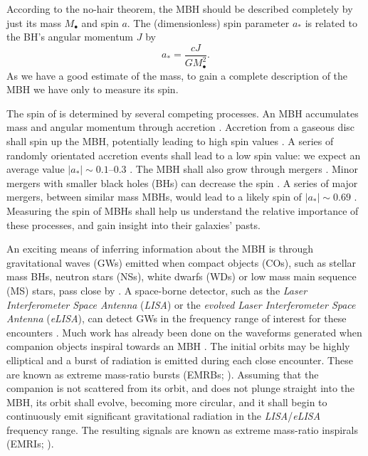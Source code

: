 \documentclass[11pt,twoside]{article}
\begin{document}
According to the no-hair theorem, the MBH should be described completely by just its mass $M_\bullet$ and spin $a$\citep{Israel1967, Israel1968, Carter1971, Hawking1972, Robinson1975, Chandrasekhar1998}. The (dimensionless) spin parameter $a_\ast$ is related to the BH's angular momentum $J$ by
\begin{equation}
a_\ast = \frac{cJ}{GM_\bullet^2}.
\end{equation}
As we have a good estimate of the mass, to gain a complete description of the MBH we have only to measure its spin.

The spin of is determined by several competing processes. An MBH accumulates mass and angular momentum through accretion \citep{Volonteri2010}. Accretion from a gaseous disc shall spin up the MBH, potentially leading to high spin values \citep{Volonteri2005}. A series of randomly orientated accretion events shall lead to a low spin value: we expect an average value $|a_\ast| \sim 0.1$--$0.3$ \citep*{King2006, King2008}. The MBH shall also grow through mergers \citep{Yu2002, Malbon2007}. Minor mergers with smaller black holes (BHs) can decrease the spin \citep*{Hughes2003, Gammie2004}. A series of major mergers, between similar mass MBHs, would lead to a likely spin of $|a_\ast| \sim 0.69$ \citep{Berti2008, Berti2007, Gonzalez2007}. Measuring the spin of MBHs shall help us understand the relative importance of these processes, and gain insight into their galaxies' pasts.

An exciting means of inferring information about the MBH is through gravitational waves (GWs) emitted when compact objects (COs), such as stellar mass BHs, neutron stars (NSs), white dwarfs (WDs) or low mass main sequence (MS) stars, pass close by \citep{Sathyaprakash2009}. A space-borne detector, such as the \textit{Laser Interferometer Space Antenna} (\textit{LISA}) or the \textit{evolved Laser Interferometer Space Antenna} (\textit{eLISA}), can detect GWs in the frequency range of interest for these encounters \citep{Bender1998, Danzmann2003, Jennrich2011, Amaro-Seoane2012a}. Much work has already been done on the waveforms generated when companion objects inspiral towards an MBH \citep{Glampedakis2005, Barack2009}. The initial orbits may be highly elliptical and a burst of radiation is emitted during each close encounter. These are known as extreme mass-ratio bursts (EMRBs; \citealt{Rubbo2006}). Assuming that the companion is not scattered from its orbit, and does not plunge straight into the MBH, its orbit shall evolve, becoming more circular, and it shall begin to continuously emit significant gravitational radiation in the \textit{LISA}/\textit{eLISA} frequency range. The resulting signals are known as extreme mass-ratio inspirals (EMRIs; \citealt{Amaro-Seoane2007}).
\end{document}
